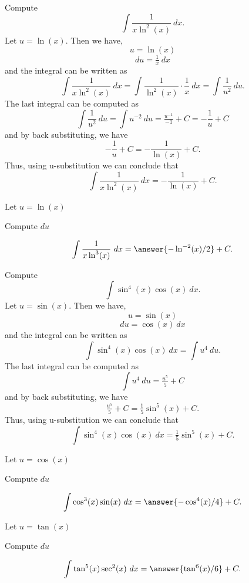 \documentclass{ximera}
\begin{document}
\begin{example} Compute 
\[\int \frac{1}{x\ln^2(x)} \ dx.\]
Let $u = \ln(x)$. Then we have,
\[u = \ln(x)\]
\[du = \tfrac1x \ dx\]
and the integral can be written as 
\[\int \frac{1}{x\ln^2(x)} \ dx = \int \frac{1}{\ln^2(x)} \cdot \frac{1}{x}\  dx = \int \frac{1}{u^2} \ du.\]
The last integral can be computed as 
\[\int \frac{1}{u^2} \ du = \int u^{-2} \ du = \tfrac{u^{-1}}{-1} + C 
= -\frac{1}{u} + C\]
and by back substituting, we have 
\[-\frac{1}{u} + C =  -\frac{1}{\ln(x)} + C.\]
Thus, using u-substitution we can conclude that
\[\int \frac{1}{x\ln^2(x)} \ dx =  -\frac{1}{\ln(x)} + C.\]
\end{example}


\begin{problem}
\begin{hint}
Let $u = \ln(x)$
\end{hint}
\begin{hint}
Compute $du$
\end{hint}
\[\int \frac{1}{x\ln^3(x)} \ dx = \answer{- \ln^{-2}(x)/2} +C.\]
\end{problem}

\begin{example} Compute 
\[\int \sin^4(x)\cos(x) \ dx.\]
Let $u = \sin(x)$. Then we have,
\[u = \sin(x)\]
\[du = \cos(x) \ dx\]
and the integral can be written as 
\[\int \sin^4(x)\cos(x) \ dx  = \int u^4 \ du.\]
The last integral can be computed as 
\[\int u^4 \ du = \tfrac{u^5}{5} + C\]
and by back substituting, we have 
\[\tfrac{u^5}{5} + C = \tfrac15 \sin^5(x) + C.\]
Thus, using u-substitution we can conclude that
\[\int \sin^4(x)\cos(x) \ dx =  \tfrac15 \sin^5(x) + C.\]
\end{example}


\begin{problem}
\begin{hint}
Let $u = \cos(x)$
\end{hint}
\begin{hint}
Compute $du$
\end{hint}
\[\int \cos^3(x)\sin(x) \ dx = \answer{-\cos^4(x)/4} +C.\]
\end{problem}


\begin{problem}
\begin{hint}
Let $u = \tan(x)$
\end{hint}
\begin{hint}
Compute $du$
\end{hint}
\[\int \tan^5(x)\sec^2(x) \ dx = \answer{\tan^6(x)/6} +C.\]
\end{problem}
\end{document}
